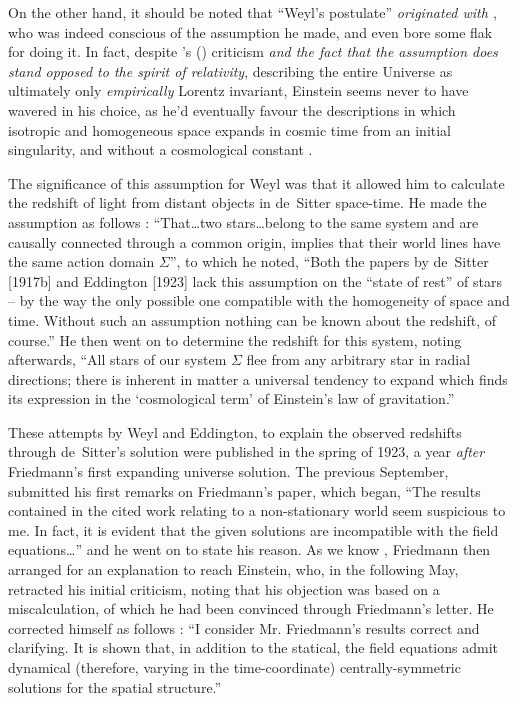 \documentclass[12 pt]{article}
\def\citeapos#1{\citeauthor{#1}'s (\citeyear{#1})}
\begin{document}
On the other hand, it should be noted that ``Weyl's postulate'' \textit{originated with \citet{Einstein1917}}, who was indeed conscious of the assumption he made, and even bore some flak for doing it. In fact, despite \citeapos{deSitter1917a} criticism \textit{and the fact that the assumption does stand opposed to the spirit of relativity}, describing the entire Universe as ultimately only \textit{empirically} Lorentz invariant, Einstein seems never to have wavered in his choice, as he'd eventually favour the descriptions in which isotropic and homogeneous space expands in cosmic time from an initial singularity, and without a cosmological constant \citep{Einstein1931a,Einstein1932,Einstein1945}.
	
The significance of this assumption for Weyl was that it allowed him to calculate the redshift of light from distant objects in de~Sitter space-time. He made the assumption as follows \citep{Weyl1923b}: ``That\ldots two stars\ldots belong to the same system and are causally connected through a common origin, implies that their world lines have the same action domain $\Sigma$'', to which he noted, ``Both the papers by de~Sitter [1917b] and Eddington [1923] lack this assumption on the ``state of rest'' of stars -- by the way the only possible one compatible with the homogeneity of space and time. Without such an assumption nothing can be known about the redshift, of course.'' He then went on to determine the redshift for this system, noting afterwards, ``All stars of our system $\Sigma$ flee from any arbitrary star in radial directions; there is inherent in matter a universal tendency to expand which finds its expression in the `cosmological term' of Einstein's law of gravitation.'' 

These attempts by Weyl and Eddington, to explain the observed redshifts through de~Sitter's solution were published in the spring of 1923, a year \textit{after} Friedmann's first expanding universe solution. The previous September, \cite{Einstein1922} submitted his first remarks on Friedmann's paper, which began, ``The results contained in the cited work relating to a non-stationary world seem suspicious to me. In fact, it is evident that the given solutions are incompatible with the field equations\ldots'' and he went on to state his reason. As we know \citep{Ellis1999}, Friedmann then arranged for an explanation to reach Einstein, who, in the following May, retracted his initial criticism, noting that his objection was based on a miscalculation, of which he had been convinced through Friedmann's letter. He corrected himself as follows \citep{Einstein1931b}: ``I consider Mr. Friedmann's results correct and clarifying. It is shown that, in addition to the statical, the field equations admit dynamical (therefore, varying in the time-coordinate) centrally-symmetric solutions for the spatial structure.''
\end{document}
